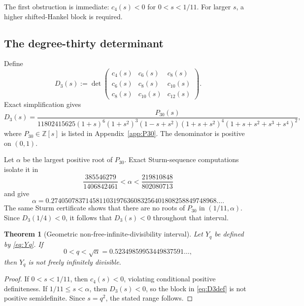 \documentclass[11pt]{article}
\newtheorem{theorem}{Theorem}[section]
\theoremstyle{definition}
\begin{document}
The first obstruction is immediate: \(c_4(s)<0\) for \(0<s<1/11\). For larger \(s\), a higher shifted-Hankel block is required.

\subsection{The degree-thirty determinant}
Define
\begin{equation}\label{eq:D3def}
D_3(s):=\det\begin{pmatrix}
c_4(s)&c_6(s)&c_8(s)\\
c_6(s)&c_8(s)&c_{10}(s)\\
c_8(s)&c_{10}(s)&c_{12}(s)
\end{pmatrix}.
\end{equation}
Exact simplification gives
\begin{equation}\label{eq:D3rational}
D_3(s)=\frac{P_{30}(s)}{
11802415625(1+s)^6(1+s^2)^3(1-s+s^2)(1+s+s^2)^4(1+s+s^2+s^3+s^4)^2},
\end{equation}
where \(P_{30}\in\mathbb Z[s]\) is listed in Appendix~\ref{app:P30}. The denominator is positive on \((0,1)\).

Let \(\alpha\) be the largest positive root of \(P_{30}\). Exact Sturm-sequence computations isolate it in
\begin{equation}\label{eq:alphainterval}
\frac{385546279}{1406842461}<\alpha<\frac{219810848}{802080713}
\end{equation}
and give
\begin{equation}\label{eq:alphaapprox}
\alpha=0.274050783714581103197636083256401808258849748968\ldots.
\end{equation}
The same Sturm certificate shows that there are no roots of \(P_{30}\) in \((1/11,\alpha)\). Since \(D_3(1/4)<0\), it follows that \(D_3(s)<0\) throughout that interval.

\begin{theorem}[Geometric non-free-infinite-divisibility interval]\label{thm:qnotFID}
Let \(Y_q\) be defined by \eqref{eq:Yq}. If
\begin{equation}\label{eq:qthreshold}
0<q<\sqrt\alpha
=0.52349859953449837591\ldots,
\end{equation}
then \(Y_q\) is not freely infinitely divisible.
\end{theorem}
\begin{proof}
If \(0<s<1/11\), then \(c_4(s)<0\), violating conditional positive definiteness. If \(1/11\le s<\alpha\), then \(D_3(s)<0\), so the block in \eqref{eq:D3def} is not positive semidefinite. Since \(s=q^2\), the stated range follows.
\end{proof}
\end{document}
